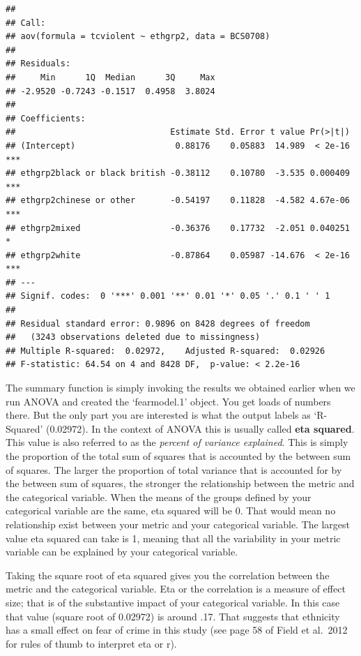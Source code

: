 \documentclass[]{book}
\theoremstyle{definition}
\theoremstyle{definition}
\theoremstyle{definition}
\theoremstyle{remark}
\begin{document}
\begin{verbatim}
## 
## Call:
## aov(formula = tcviolent ~ ethgrp2, data = BCS0708)
## 
## Residuals:
##     Min      1Q  Median      3Q     Max 
## -2.9520 -0.7243 -0.1517  0.4958  3.8024 
## 
## Coefficients:
##                               Estimate Std. Error t value Pr(>|t|)    
## (Intercept)                    0.88176    0.05883  14.989  < 2e-16 ***
## ethgrp2black or black british -0.38112    0.10780  -3.535 0.000409 ***
## ethgrp2chinese or other       -0.54197    0.11828  -4.582 4.67e-06 ***
## ethgrp2mixed                  -0.36376    0.17732  -2.051 0.040251 *  
## ethgrp2white                  -0.87864    0.05987 -14.676  < 2e-16 ***
## ---
## Signif. codes:  0 '***' 0.001 '**' 0.01 '*' 0.05 '.' 0.1 ' ' 1
## 
## Residual standard error: 0.9896 on 8428 degrees of freedom
##   (3243 observations deleted due to missingness)
## Multiple R-squared:  0.02972,    Adjusted R-squared:  0.02926 
## F-statistic: 64.54 on 4 and 8428 DF,  p-value: < 2.2e-16
\end{verbatim}

The summary function is simply invoking the results we obtained earlier
when we run ANOVA and created the `fearmodel.1' object. You get loads of
numbers there. But the only part you are interested is what the output
labels as `R-Squared' (0.02972). In the context of ANOVA this is usually
called \textbf{eta squared}. This value is also referred to as the
\emph{percent of variance explained}. This is simply the proportion of
the total sum of squares that is accounted by the between sum of
squares. The larger the proportion of total variance that is accounted
for by the between sum of squares, the stronger the relationship between
the metric and the categorical variable. When the means of the groups
defined by your categorical variable are the same, eta squared will be
0. That would mean no relationship exist between your metric and your
categorical variable. The largest value eta squared can take is 1,
meaning that all the variability in your metric variable can be
explained by your categorical variable.

Taking the square root of eta squared gives you the correlation between
the metric and the categorical variable. Eta or the correlation is a
measure of effect size; that is of the substantive impact of your
categorical variable. In this case that value (square root of 0.02972)
is around .17. That suggests that ethnicity has a small effect on fear
of crime in this study (see page 58 of Field et al.~2012 for rules of
thumb to interpret eta or r).
\end{document}
